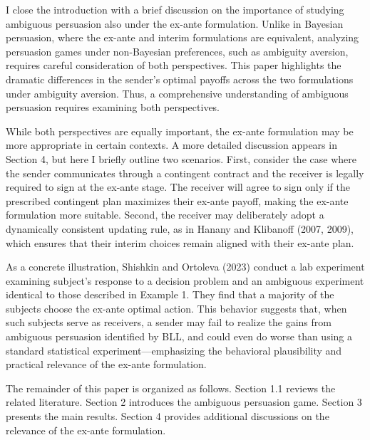 \documentclass[12pt,a4paper]{article}
\theoremstyle{definition}
\theoremstyle{remark}
\newenvironment{original}{%
    \par\medskip\noindent%
    \begin{tcolorbox}[%
        colback=white,%
        colframe=black!50,%
        title=\textbf{Original English},%
        fonttitle=\small\bfseries,%
        left=0pt, right=0pt, top=2pt, bottom=2pt,%
        boxrule=0.5pt,%
        arc=0pt,%
        outer arc=0pt%
    ]%
    \small%
}{%
    \end{tcolorbox}%
}
\begin{document}
\begin{original}
I close the introduction with a brief discussion on the importance of studying ambiguous persuasion also under the ex-ante formulation. Unlike in Bayesian persuasion, where the ex-ante and interim formulations are equivalent, analyzing persuasion games under non-Bayesian preferences, such as ambiguity aversion, requires careful consideration of both perspectives. This paper highlights the dramatic differences in the sender's optimal payoffs across the two formulations under ambiguity aversion. Thus, a comprehensive understanding of ambiguous persuasion requires examining both perspectives.

While both perspectives are equally important, the ex-ante formulation may be more appropriate in certain contexts. A more detailed discussion appears in Section 4, but here I briefly outline two scenarios. First, consider the case where the sender communicates through a contingent contract and the receiver is legally required to sign at the ex-ante stage. The receiver will agree to sign only if the prescribed contingent plan maximizes their ex-ante payoff, making the ex-ante formulation more suitable. Second, the receiver may deliberately adopt a dynamically consistent updating rule, as in Hanany and Klibanoff (2007, 2009), which ensures that their interim choices remain aligned with their ex-ante plan.

As a concrete illustration, Shishkin and Ortoleva (2023) conduct a lab experiment examining subject's response to a decision problem and an ambiguous experiment identical to those described in Example 1. They find that a majority of the subjects choose the ex-ante optimal action. This behavior suggests that, when such subjects serve as receivers, a sender may fail to realize the gains from ambiguous persuasion identified by BLL, and could even do worse than using a standard statistical experiment---emphasizing the behavioral plausibility and practical relevance of the ex-ante formulation.

The remainder of this paper is organized as follows. Section 1.1 reviews the related literature. Section 2 introduces the ambiguous persuasion game. Section 3 presents the main results. Section 4 provides additional discussions on the relevance of the ex-ante formulation.
\end{original}
\end{document}
